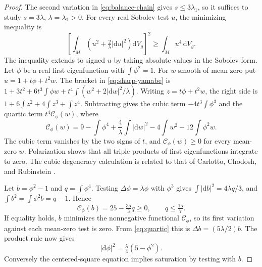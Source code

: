 \documentclass[11pt]{article}
\numberwithin{equation}{section}
\newcommand{\dd}{\mathrm{d}}
\newcommand{\abs}[1]{\lvert #1\rvert}
\newcommand{\dv}{\dd V_g}
\begin{document}
\begin{proof}
The second variation in \eqref{eq:balance-chain} gives \(s\le3\lambda_1\),
so it suffices to study \(s=3\lambda\), \(\lambda=\lambda_1>0\).
For every real Sobolev test \(u\), the minimizing inequality is
\begin{equation}\label{eq:sharp-yamabe}
 \left[\int_M\left(u^2+\tfrac2\lambda\abs{\dd u}^2\right)\dv\right]^2
 \ge \int_M u^4\,\dv .
\end{equation}
The inequality extends to signed \(u\) by taking absolute values
in the Sobolev form. Let \(\phi\) be a real first eigenfunction with
\(\int\phi^2=1\). For \(w\) smooth of mean zero put
\(u=1+t\phi+t^2w\). The bracket in \eqref{eq:sharp-yamabe} is
\(1+3t^2+6t^3\int\phi w+t^4\int(w^2+2\abs{\dd w}^2/\lambda)\).
Writing \(z=t\phi+t^2w\), the right side is
\(1+6\int z^2+4\int z^3+\int z^4\).
Subtracting gives the cubic term \(-4t^3\int\phi^3\) and
the quartic term \(t^4\mathcal C_\phi(w)\), where
\begin{equation}\label{eq:quartic}
 \mathcal C_\phi(w)
 =9-\int\phi^4+\frac4\lambda\int\abs{\dd w}^2
            -4\int w^2-12\int\phi^2 w .
\end{equation}
The cubic term vanishes by the two signs of \(t\), and
\(\mathcal C_\phi(w)\ge0\) for every mean-zero \(w\).
Polarization shows that all triple products of first
eigenfunctions integrate to zero. The cubic degeneracy calculation
is related to that of Carlotto, Chodosh, and Rubinstein
\cite[Proposition~7]{CarlottoChodoshRubinstein2015Yamabe}.

Let \(b=\phi^2-1\) and \(q=\int\phi^4\).
Testing \(\Delta\phi=\lambda\phi\) with \(\phi^3\) gives
\(\int\abs{\dd b}^2=4\lambda q/3\), and
\(\int b^2=\int\phi^2 b=q-1\). Hence
\begin{equation}\label{eq:quartic-sharp}
 \mathcal C_\phi(b)=25-\tfrac{35}{3}q\ge0,\qquad
 q\le\tfrac{15}{7}.
\end{equation}
If equality holds, \(b\) minimizes the nonnegative functional
\(\mathcal C_\phi\), so its first variation against each mean-zero
test is zero. From \eqref{eq:quartic} this is
\(\Delta b=(5\lambda/2)b\). The product rule now gives
\[
 \abs{\dd\phi}^2=\tfrac{\lambda}{4}(5-\phi^2).
\]
Conversely the centered-square equation implies saturation by
testing with \(b\).


\end{proof}
\end{document}
